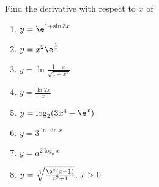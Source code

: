 \begin{problem}
    Find the derivative with respect to $x$ of

    \begin{enumerate}
        \item $y = \e^{1 + \sin 3x}$
        \item $y = x^2 \e^\frac1{x}$
        \item $y = \ln{\frac{1-x}{\sqrt{1+x^2}}}$
        \item $y = \frac{\ln{2x}}x$
        \item $y = \log_2 (3x^4 - \e^x)$
        \item $y = 3^{\ln \sin x}$
        \item $y = a^{2\log_a x}$
        \item $y = \sqrt[3]{\frac{\e^x (x+1)}{x^2 +1}}, \, x > 0$
    \end{enumerate}
\end{problem}
